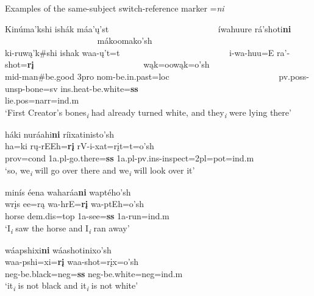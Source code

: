 \begin{exe}

\item\label{switchreferenSSexamples} Examples of the same-subject switch-reference marker =\textit{ni}

	\begin{xlist}
	
	\item\label{switchreferenSSexamples1} 
	\glll Kinúma'kshi ishák máa'ų'st ~ ~ ~ ~ ~ ~ ~ ~ ~ ~ ~ ~ ~ ~ ~ íwahuure rá'shoti\textbf{ni} ~ ~ ~ ~ ~ ~ ~ ~ ~ ~ ~ ~ ~ ~ ~ mákoomako'sh\\
	ki-ruwą'k\#shi ishak waa-ų't=t ~ ~ ~ ~ ~ ~ ~ ~ ~ ~ ~ ~ ~ ~ ~ i-wa-huu=E ra'-shot=\textbf{rį} ~ ~ ~ ~ ~ ~ ~ ~ ~ ~ ~ ~ ~ ~ ~ wąk=oowąk=o'sh\\
	mid-\textnormal{man}\#\textnormal{be.good} 3pro nom-\textnormal{be.in.past}=loc ~ ~ ~ ~ ~ ~ ~ ~ ~ ~ ~ ~ ~ ~ ~ pv.poss-unsp-\textnormal{bone}=sv ins.heat-\textnormal{be.white}=\textbf{ss} ~ ~ ~ ~ ~ ~ ~ ~ ~ ~ ~ ~ ~ ~ ~ lie.pos=narr=ind.m\\
	\glt `First Creator's bones\textsubscript{\textit{i}} had already turned white, and they\textsubscript{\textit{i}} were lying there' \citep[1]{hollow1973a}

	\item\label{switchreferenSSexamples2} 
	\glll háki nuráahi\textbf{ni} ríixatinisto'sh\\
	ha=ki rų-rEEh=\textbf{rį} rV-i-xat=rįt=t=o'sh\\
	prov=cond 1a.pl-\textnormal{go.there}=\textbf{ss} 1a.pl-pv.ins-\textnormal{inspect}=2pl=pot=ind.m\\
	\glt `so, we\textsubscript{\textit{i}} will go over there and we\textsubscript{\textit{i}} will look over it' \citep[11]{hollow1973a}

	\item\label{switchreferenSSexamples3}
	\glll minís éena waharáa\textbf{ni} waptého'sh\\
	wrįs ee=rą wa-hrE=\textbf{rį} wa-ptEh=o'sh\\
	\textnormal{horse} dem.dis=top 1a-\textnormal{see}=\textbf{ss} 1a-\textnormal{run}=ind.m\\
	\glt `I\textsubscript{\textit{i}} saw the horse and I\textsubscript{\textit{i}} ran away' \citep[5]{mixco1997b} 

	\item\label{switchreferenSSexamples4}
	\glll wáapshixi\textbf{ni} wáashotinixo'sh\\
	waa-pshi=xi=\textbf{rį} waa-shot=rįx=o'sh\\
	neg-\textnormal{be.black}=neg=\textbf{ss} neg-\textnormal{be.white}=neg=ind.m\\
	\glt `it\textsubscript{\textit{i}} is not black and it\textsubscript{\textit{i}} is not white' \citep[5]{mixco1997b}
	
	\end{xlist}

\end{exe}

